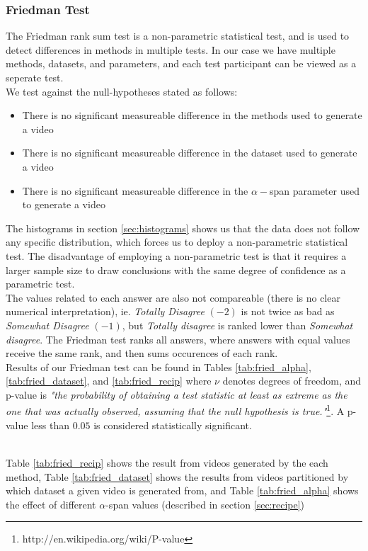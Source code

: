 \subsubsection{Friedman Test}\label{sec:friedman}
%
The Friedman rank sum test
 is a non-parametric statistical test, and is used to detect differences in methods in multiple tests. In our case we have multiple methods, datasets, and parameters, and each test participant can be viewed as a seperate test.\\
 We test against the null-hypotheses stated as follows: 
 \begin{itemize}
 \item There is no significant measureable difference in the methods used to generate a video
 \item There is no significant measureable difference in the dataset used to generate a video
 \item There is no significant measureable difference in the $\alpha-$span parameter used to generate a video
 \end{itemize}
%
The histograms in section \ref{sec:histograms} shows us that the data does not follow any specific distribution, which forces us to deploy a non-parametric statistical test. The disadvantage of employing a non-parametric test is that it requires a larger sample size to draw conclusions with the same degree of confidence as a parametric test.\\
%
The values related to each answer are also not compareable (there is no clear numerical interpretation), ie. \textit{Totally Disagree} $(-2)$ is not twice as bad as \textit{Somewhat Disagree} $(-1)$, but \textit{Totally disagree} is ranked lower than \textit{Somewhat disagree}. The Friedman test ranks all answers, where answers with equal values receive the same rank, and then sums occurences of each rank.\\
%
Results of our Friedman test can be found in Tables \ref{tab:fried_alpha}, \ref{tab:fried_dataset}, and \ref{tab:fried_recip} where $\nu$ denotes degrees of freedom, and p-value is \textit{"the probability of obtaining a test statistic at least as extreme as the one that was actually observed, assuming that the null hypothesis is true."}\footnote{http://en.wikipedia.org/wiki/P-value}. A p-value less than $0.05$ is considered statistically significant.



%
\\
Table \ref{tab:fried_recip} shows the result from videos generated by the each method, Table \ref{tab:fried_dataset} shows the results from videos partitioned by which dataset a given video is generated from, and Table \ref{tab:fried_alpha} shows the effect of different $\alpha$-span values (described in section \ref{sec:recipe})
%
